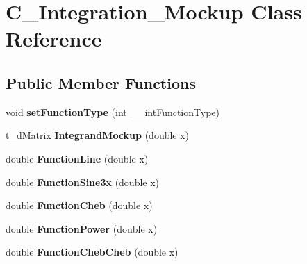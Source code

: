 \hypertarget{class_c___integration___mockup}{\section{C\-\_\-\-Integration\-\_\-\-Mockup Class Reference}
\label{class_c___integration___mockup}
}
\subsection*{Public Member Functions}
\begin{DoxyCompactItemize}
\item 
\hypertarget{class_c___integration___mockup_a277f0c63bed990b9c8beae175be845e6}{void {\bfseries set\-Function\-Type} (int \-\_\-\-\_\-int\-Function\-Type)}\label{class_c___integration___mockup_a277f0c63bed990b9c8beae175be845e6}

\item 
\hypertarget{class_c___integration___mockup_a0cf4106561a8032a45ab56d346ca48ed}{t\-\_\-d\-Matrix {\bfseries Integrand\-Mockup} (double x)}\label{class_c___integration___mockup_a0cf4106561a8032a45ab56d346ca48ed}

\item 
\hypertarget{class_c___integration___mockup_ae5fea8d5929f9e08bd8a520bc6fc007e}{double {\bfseries Function\-Line} (double x)}\label{class_c___integration___mockup_ae5fea8d5929f9e08bd8a520bc6fc007e}

\item 
\hypertarget{class_c___integration___mockup_abe3f2f04b984ae16533e71fa75a3ac43}{double {\bfseries Function\-Sine3x} (double x)}\label{class_c___integration___mockup_abe3f2f04b984ae16533e71fa75a3ac43}

\item 
\hypertarget{class_c___integration___mockup_a283bf7e4fa7926c5c309b3d05250857e}{double {\bfseries Function\-Cheb} (double x)}\label{class_c___integration___mockup_a283bf7e4fa7926c5c309b3d05250857e}

\item 
\hypertarget{class_c___integration___mockup_a6072270abf1e552a30b3b8eeaae56b57}{double {\bfseries Function\-Power} (double x)}\label{class_c___integration___mockup_a6072270abf1e552a30b3b8eeaae56b57}

\item 
\hypertarget{class_c___integration___mockup_ad0b2dc2666f3f535bb8de192dea15000}{double {\bfseries Function\-Cheb\-Cheb} (double x)}\label{class_c___integration___mockup_ad0b2dc2666f3f535bb8de192dea15000}


\end{DoxyCompactItemize}
